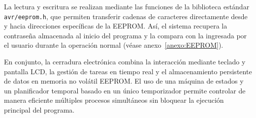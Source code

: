     \vspace{1em}

    La lectura y escritura se realizan mediante las funciones de la biblioteca estándar \texttt{avr/eeprom.h}, que permiten transferir cadenas de caracteres directamente desde y hacia direcciones específicas de la EEPROM. Así, el sistema recupera la contraseña almacenada al inicio del programa y la compara con la ingresada por el usuario durante la operación normal (véase anexo~\ref{anexo:EEPROM}).

    \vspace{1em}

    En conjunto, la cerradura electrónica combina la interacción mediante teclado y pantalla LCD, la gestión de tareas en tiempo real y el almacenamiento persistente de datos en memoria no volátil EEPROM. El uso de una máquina de estados y un planificador temporal basado en un único temporizador permite controlar de manera eficiente múltiples procesos simultáneos sin bloquear la ejecución principal del programa.

